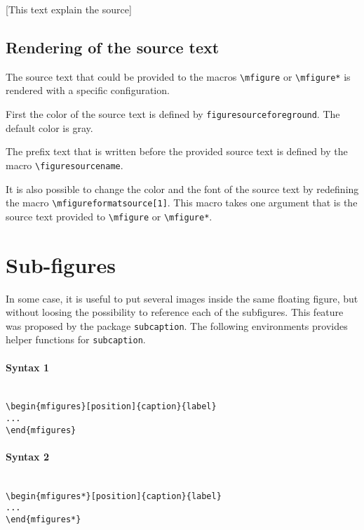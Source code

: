 \documentclass[book,taskpackage,specpackage,codepackage]{upmethodology-document}
\begin{document}
[This text explain the source]

\subsection{Rendering of the source text}

The source text that could be provided to the macros \texttt{{\textbackslash}mfigure} or \texttt{{\textbackslash}mfigure*} is rendered with a specific configuration.

First the color of the source text is defined by \texttt{figuresourceforeground}. The default color is \textcolor{figuresourceforeground}{gray}.

The prefix text that is written before the provided source text is defined by the macro \texttt{{\textbackslash}figuresourcename}.

It is also possible to change the color and the font of the source text by redefining the macro \texttt{{\textbackslash}mfigureformatsource[1]}. This macro takes one argument that is the source text provided to \texttt{{\textbackslash}mfigure} or \texttt{{\textbackslash}mfigure*}.

\section{Sub-figures}

In some case, it is useful to put several images inside the same floating figure, but without loosing the possibility to reference each of the subfigures. This feature was proposed by the package \texttt{subcaption}. The following environments provides helper functions for \texttt{subcaption}.

\paragraph{Syntax 1} \mbox{}\\
\texttt{{\textbackslash}begin\{mfigures\}[position]\{caption\}\{label\}\\
...\\
{\textbackslash}end\{mfigures\}}

\paragraph{Syntax 2} \mbox{}\\
\texttt{{\textbackslash}begin\{mfigures*\}[position]\{caption\}\{label\}\\
...\\
{\textbackslash}end\{mfigures*\}}
\end{document}
